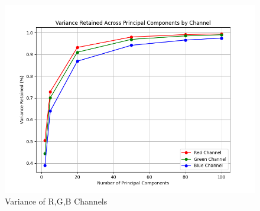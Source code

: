 \documentclass[11pt]{article}
\begin{document}
\begin{figure}[htbp]
    	\centering
    	\includegraphics[width=\textwidth]{figures/hw3_1_2.png}
    	\caption{Variance of R,G,B Channels}
		\label{fig:variance_lena}
\end{figure}

	
		\newpage
\end{document}
